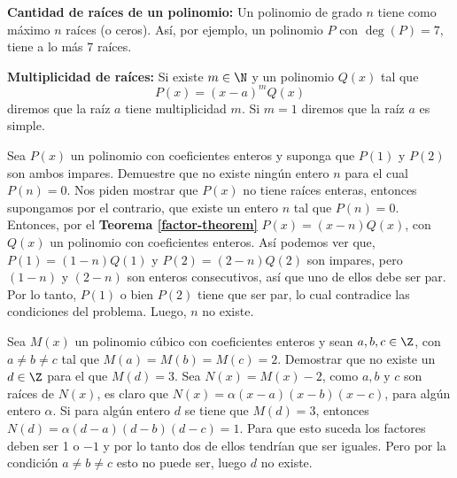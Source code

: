 {    \textbf{Cantidad de raíces de un polinomio:} Un polinomio de grado $n$ tiene como máximo $n$ raíces (o ceros). Así, por ejemplo, un polinomio $P$ con $\deg{(P)} = 7$, tiene a lo más 7 raíces.

    \textbf{Multiplicidad de raíces:} Si existe $m \in \N$ y un polinomio $Q(x)$ tal que \[P(x) = (x - a)^m Q(x)\] diremos que la raíz $a$ tiene multiplicidad $m$. Si $m = 1$ diremos que la raíz $a$ es simple.

    \begin{example}
        Sea $P(x)$ un polinomio con coeficientes enteros y suponga que $P(1)$ y $P(2)$ son ambos impares. Demuestre que no existe ningún entero $n$ para el cual $P(n) = 0$.
        \exampleProof
        {
            Nos piden mostrar que $P(x)$ no tiene raíces enteras, entonces supongamos por el contrario, que existe un entero $n$ tal que $P(n) = 0$. Entonces, por el \textbf{Teorema \ref{factor-theorem}} $P(x) = (x - n)Q(x)$, con $Q(x)$ un polinomio con coeficientes enteros. Así podemos ver que, $P(1) = (1 - n)Q(1)$ y $P(2) = (2 - n)Q(2)$ son impares, pero $(1 - n)$ y $(2 - n)$ son enteros consecutivos, así que uno de ellos debe ser par. Por lo tanto, $P(1)$ o bien $P(2)$ tiene que ser par, lo cual contradice las condiciones del problema. Luego, $n$ no existe.
        }
    \end{example}

    \begin{example}
        Sea $M(x)$ un polinomio cúbico con coeficientes enteros y sean $a, b, c \in \Z$, con $a \neq b \neq c$ tal que $M(a) = M(b) = M(c) = 2$. Demostrar que no existe un $d \in \Z$ para el que $M(d) = 3.$
        \exampleProof
        {
            Sea $N(x) = M(x) - 2$, como $a, b \mbox{ y } c$ son raíces de $N(x)$, es claro que $N(x) = \alpha (x - a)(x - b)(x - c)$, para algún entero $\alpha$. Si para algún entero $d$ se tiene que $M(d) = 3$, entonces $N(d) = \alpha (d - a)(d - b)(d - c) = 1$. Para que esto suceda los factores deben ser 1 o $-1$ y por lo tanto dos de ellos tendrían que ser iguales. Pero por la condición $a \neq b \neq c$ esto no puede ser, luego $d$ no existe.
        }
    \end{example}
}
\label{subsec:definiciones}

